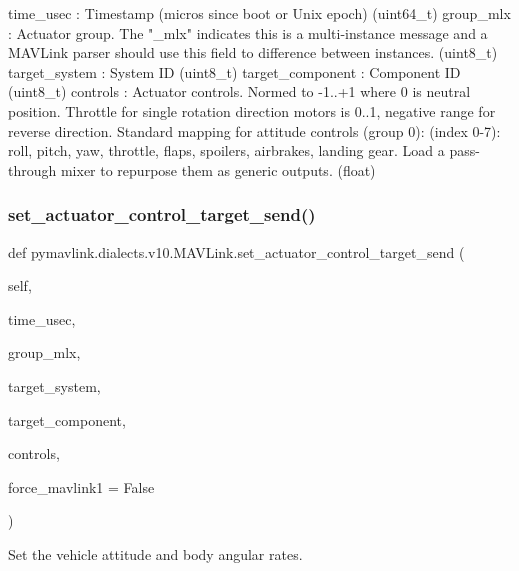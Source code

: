 \begin{DoxyVerb}
\begin{DoxyVerb}
\begin{DoxyVerb}
\begin{DoxyVerb}
\begin{DoxyVerb}
\begin{DoxyVerb}
\begin{DoxyVerb}
\begin{DoxyVerb}
\begin{DoxyVerb}
\begin{DoxyVerb}
\begin{DoxyVerb}
time_usec                 : Timestamp (micros since boot or Unix epoch) (uint64_t)
group_mlx                 : Actuator group. The "_mlx" indicates this is a multi-instance message and a MAVLink parser should use this field to difference between instances. (uint8_t)
target_system             : System ID (uint8_t)
target_component          : Component ID (uint8_t)
controls                  : Actuator controls. Normed to -1..+1 where 0 is neutral position. Throttle for single rotation direction motors is 0..1, negative range for reverse direction. Standard mapping for attitude controls (group 0): (index 0-7): roll, pitch, yaw, throttle, flaps, spoilers, airbrakes, landing gear. Load a pass-through mixer to repurpose them as generic outputs. (float)\end{DoxyVerb}
 \mbox{\label{classpymavlink_1_1dialects_1_1v10_1_1MAVLink_abbd1b220e6bb8f5269ef97284d9a6cd4}} 
\subsubsection{\texorpdfstring{set\+\_\+actuator\+\_\+control\+\_\+target\+\_\+send()}{set\_actuator\_control\_target\_send()}}
{\footnotesize\ttfamily def pymavlink.\+dialects.\+v10.\+M\+A\+V\+Link.\+set\+\_\+actuator\+\_\+control\+\_\+target\+\_\+send (\begin{DoxyParamCaption}\item[{}]{self,  }\item[{}]{time\+\_\+usec,  }\item[{}]{group\+\_\+mlx,  }\item[{}]{target\+\_\+system,  }\item[{}]{target\+\_\+component,  }\item[{}]{controls,  }\item[{}]{force\+\_\+mavlink1 = {\ttfamily False} }\end{DoxyParamCaption})}

\begin{DoxyVerb}Set the vehicle attitude and body angular rates.


\end{DoxyVerb}
\end{DoxyVerb}
\end{DoxyVerb}
\end{DoxyVerb}
\end{DoxyVerb}
\end{DoxyVerb}
\end{DoxyVerb}
\end{DoxyVerb}
\end{DoxyVerb}
\end{DoxyVerb}
\end{DoxyVerb}
